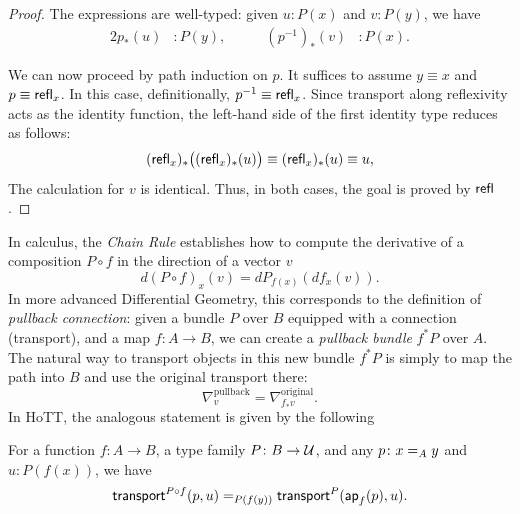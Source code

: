 \begin{proof}
    The expressions are well-typed: given $u\colon P(x)$ and $v\colon P(y)$, we have
    \begin{alignat*}{2}
        p_*(u) &\colon P(y), &\qquad (p^{-1})_*(v) &\colon P(x).
    \end{alignat*}
    
    We can now proceed by path induction on $p$. It suffices to assume $y\equiv x$ and $p\equiv\mathsf{refl}_x$. In this case, definitionally, $p^{-1}\equiv\mathsf{refl}_x$. Since transport along reflexivity acts as the identity function, the left-hand side of the first identity type reduces as follows:
    \[
        (\mathsf{refl}_x)_*\bigl((\mathsf{refl}_x)_*(u)\bigr) \equiv (\mathsf{refl}_x)_*(u) \equiv u,
    \]
    The calculation for $v$ is identical. Thus, in both cases, the goal is proved by $\mathsf{refl}$.
    
\end{proof}

\begin{rem}
    In calculus, the \textit{Chain Rule} establishes how to compute the derivative of a composition $P\circ f$ in the direction of a vector $v$
    \[
        d(P\circ f)_x(v) = dP_{f(x)}(df_x(v)).
    \]
    In more advanced Differential Geometry, this corresponds to the definition of \textit{pullback connection}: given a bundle $P$ over $B$ equipped with a connection (transport), and a map $f\colon A\to B$, we can create a \textit{pullback bundle} $f^*P$ over $A$. The natural way to transport objects in this new bundle $f^*P$ is simply to map the path into $B$ and use the original transport there:
    \[
        \nabla^{\text{pullback}}_v = \nabla^{\text{original}}_{f_*v}.
    \]
    In HoTT, the analogous statement is given by the following
\end{rem}

\begin{lem}\label{lem:post-composition-transport}
    For a function\/ $f \colon A \to B$, a type family\/ $P \colon B \to \univ$, and any\/ $p \colon x \eq A y$ and\/ $u \colon P(f(x))$, we have
    \[
        \mathsf{transport}^{P\circ f}(p,u)
        \mathrel{=_{P(f(y))}}
        \mathsf{transport}^P(\mathsf{ap}_f(p),u).
    \]
\end{lem}

